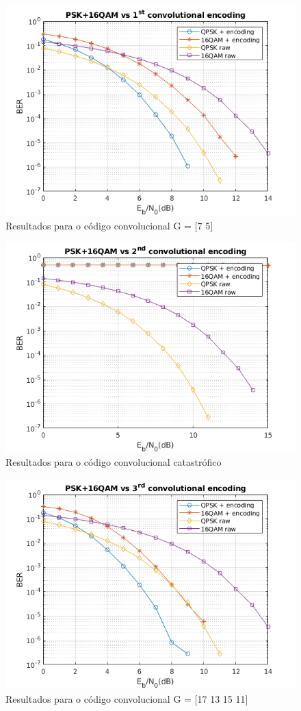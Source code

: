 \documentclass[
	10pt, %
	spanish, %
]{fphw}
\begin{document}
\begin{figure}[htb]
\centering
\includegraphics{fst.png}
\caption{Resultados para o código convolucional G = [7 5]}
\end{figure}
\begin{figure}[htb]
\centering
\includegraphics{snd.png}
\caption{Resultados para o código convolucional catastrófico}
\end{figure}
\begin{figure}[htb]
\centering
\includegraphics{third.png}
\caption{Resultados para o código convolucional G = [17 13 15 11]}
\end{figure}
\end{document}
